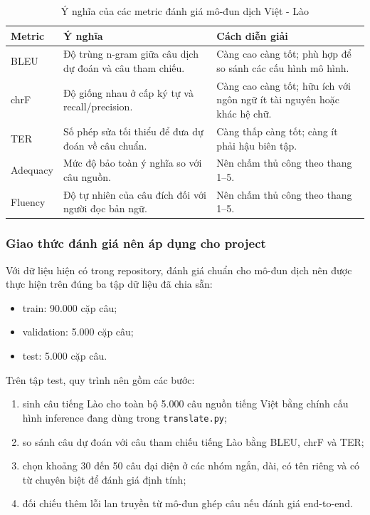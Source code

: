 \begin{table}[H]
\centering
\caption{Ý nghĩa của các metric đánh giá mô-đun dịch Việt - Lào}
\begin{tabularx}{\textwidth}{|p{2.5cm}|X|X|}
\hline
\textbf{Metric} & \textbf{Ý nghĩa} & \textbf{Cách diễn giải} \\
\hline
BLEU & Độ trùng n-gram giữa câu dịch dự đoán và câu tham chiếu. & Càng cao càng tốt; phù hợp để so sánh các cấu hình mô hình. \\
\hline
chrF & Độ giống nhau ở cấp ký tự và recall/precision. & Càng cao càng tốt; hữu ích với ngôn ngữ ít tài nguyên hoặc khác hệ chữ. \\
\hline
TER & Số phép sửa tối thiểu để đưa dự đoán về câu chuẩn. & Càng thấp càng tốt; càng ít phải hậu biên tập. \\
\hline
Adequacy & Mức độ bảo toàn ý nghĩa so với câu nguồn. & Nên chấm thủ công theo thang 1--5. \\
\hline
Fluency & Độ tự nhiên của câu đích đối với người đọc bản ngữ. & Nên chấm thủ công theo thang 1--5. \\
\hline
\end{tabularx}
\end{table}

\subsubsection{Giao thức đánh giá nên áp dụng cho project}

Với dữ liệu hiện có trong repository, đánh giá chuẩn cho mô-đun dịch nên được thực hiện
trên đúng ba tập dữ liệu đã chia sẵn:
\begin{itemize}
    \item train: 90.000 cặp câu;
    \item validation: 5.000 cặp câu;
    \item test: 5.000 cặp câu.
\end{itemize}

Trên tập test, quy trình nên gồm các bước:
\begin{enumerate}
    \item sinh câu tiếng Lào cho toàn bộ 5.000 câu nguồn tiếng Việt bằng chính cấu hình
    inference đang dùng trong \texttt{translate.py};
    \item so sánh câu dự đoán với câu tham chiếu tiếng Lào bằng BLEU, chrF và TER;
    \item chọn khoảng 30 đến 50 câu đại diện ở các nhóm ngắn, dài, có tên riêng và có từ
    chuyên biệt để đánh giá định tính;
    \item đối chiếu thêm lỗi lan truyền từ mô-đun ghép câu nếu đánh giá end-to-end.
\end{enumerate}

